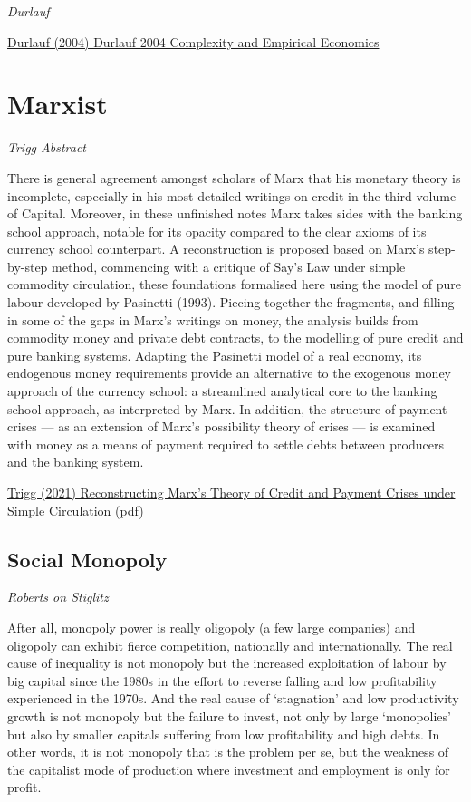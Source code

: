 \documentclass[
]{book}
\begin{document}
\emph{Durlauf}

\href{pdf/Durlauf_2004_Complexity_and_Empirical_Economics.pdf}{Durlauf (2004) Durlauf 2004 Complexity and Empirical Economics}

\hypertarget{marxist}{%
\chapter{Marxist}\label{marxist}}

\emph{Trigg Abstract}

There is general agreement amongst scholars of Marx that his
monetary theory is incomplete, especially in his most detailed
writings on credit in the third volume of Capital. Moreover, in
these unfinished notes Marx takes sides with the banking school
approach, notable for its opacity compared to the clear axioms of
its currency school counterpart. A reconstruction is proposed
based on Marx's step-by-step method, commencing with a
critique of Say's Law under simple commodity circulation, these
foundations formalised here using the model of pure labour
developed by Pasinetti (1993). Piecing together the fragments,
and filling in some of the gaps in Marx's writings on money, the
analysis builds from commodity money and private debt
contracts, to the modelling of pure credit and pure banking
systems. Adapting the Pasinetti model of a real economy, its
endogenous money requirements provide an alternative to the
exogenous money approach of the currency school: a
streamlined analytical core to the banking school approach, as
interpreted by Marx. In addition, the structure of payment crises
--- as an extension of Marx's possibility theory of crises --- is
examined with money as a means of payment required to settle
debts between producers and the banking system.

\href{https://doi.org/10.1080/09538259.2021.1897751}{Trigg (2021) Reconstructing Marx's Theory of Credit and Payment Crises under Simple Circulation}
\href{pdf/Trigg_2021_Marx_Credit_Theory.pdf}{(pdf)}

\hypertarget{social-monopoly}{%
\section{Social Monopoly}\label{social-monopoly}}

\emph{Roberts on Stiglitz}

After all, monopoly power is really oligopoly (a few large companies) and oligopoly can exhibit fierce competition, nationally and internationally. The real cause of inequality is not monopoly but the increased exploitation of labour by big capital since the 1980s in the effort to reverse falling and low profitability experienced in the 1970s. And the real cause of `stagnation' and low productivity growth is not monopoly but the failure to invest, not only by large `monopolies' but also by smaller capitals suffering from low profitability and high debts. In other words, it is not monopoly that is the problem per se, but the weakness of the capitalist mode of production where investment and employment is only for profit.
\end{document}
